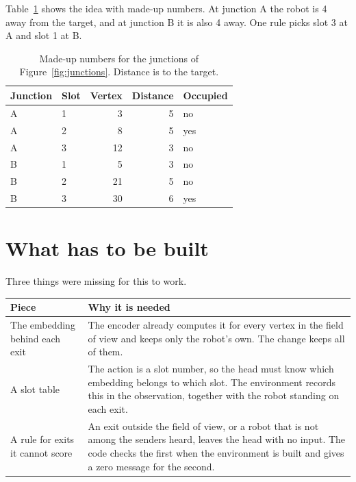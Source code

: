 \documentclass[11pt,a4paper]{article}
\begin{document}
Table~\ref{tab:illustration} shows the idea with made-up numbers. At
junction A the robot is 4 away from the target, and at junction B it is also
4 away. One rule picks slot 3 at A and slot 1 at B.

\begin{table}[h]
  \centering
  \small
  \caption{Made-up numbers for the junctions of Figure~\ref{fig:junctions}. Distance is to the target.}
  \label{tab:illustration}
  \begin{tabular}{@{}llrrl@{}}
    \toprule
    Junction & Slot & Vertex & Distance & Occupied \\
    \midrule
    A & 1 & 3  & 5 & no \\
    A & 2 & 8  & 5 & yes \\
    A & 3 & 12 & 3 & no \\
    \midrule
    B & 1 & 5  & 3 & no \\
    B & 2 & 21 & 5 & no \\
    B & 3 & 30 & 6 & yes \\
    \bottomrule
  \end{tabular}
\end{table}

\section{What has to be built}

Three things were missing for this to work.

\begin{center}
\small
\begin{tabular}{@{}p{3.6cm}p{11.4cm}@{}}
\toprule
Piece & Why it is needed \\
\midrule
The embedding behind each exit &
  The encoder already computes it for every vertex in the field of view and
  keeps only the robot's own. The change keeps all of them. \\[3pt]
A slot table &
  The action is a slot number, so the head must know which embedding belongs
  to which slot. The environment records this in the observation, together
  with the robot standing on each exit. \\[3pt]
A rule for exits it cannot score &
  An exit outside the field of view, or a robot that is not among the
  senders heard, leaves the head with no input. The code checks the first
  when the environment is built and gives a zero message for the second. \\
\bottomrule
\end{tabular}
\end{center}
\end{document}
